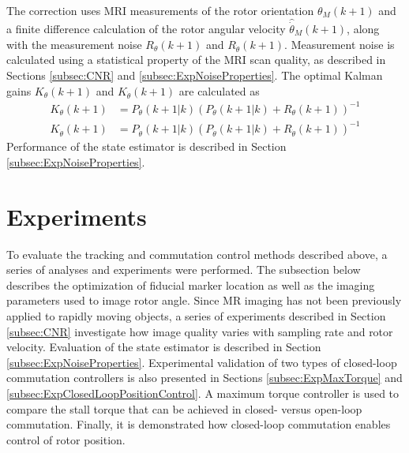 \documentclass[journal]{IEEEtran}
\begin{document}
The correction uses MRI measurements of the rotor orientation $\theta_M(k+1)$ and a finite difference calculation of the rotor angular velocity $\hat{\dot{\theta}}_M(k+1)$, along with the measurement noise $R_{\theta}(k+1)$ and $R_{\dot{\theta}}(k+1)$. Measurement noise is calculated using a statistical property of the MRI scan quality, as described in Sections \ref{subsec:CNR} and \ref{subsec:ExpNoiseProperties}.
The optimal Kalman gains $K_{\theta}(k+1)$ and $K_{\dot{\theta}}(k+1)$ are calculated as
\begin{align}
K_{\theta}(k+1) &= P_{\theta}(k+1|k) ( P_{\theta}(k+1|k)  + R_{\theta}(k+1))^{-1} \nonumber \\
K_{\dot{\theta}}(k+1) &= P_{\dot{\theta}}(k+1|k) ( P_{\dot{\theta}}(k+1|k)  + R_{\dot{\theta}}(k+1))^{-1} 
\label{eq:StateCorrectionKalmanGain}
\end{align}
Performance of the state estimator is described in Section \ref{subsec:ExpNoiseProperties}.

\section{Experiments}
\label{sec:experiments}
To evaluate the tracking and commutation control methods described above, a series of analyses and experiments were performed. The subsection below describes the optimization of fiducial marker location as well as the imaging parameters used to image rotor angle. Since MR imaging has not been previously applied to rapidly moving objects,  a series of experiments described in Section \ref{subsec:CNR} investigate how image quality varies with sampling rate and rotor velocity. Evaluation of the state estimator is described in Section \ref{subsec:ExpNoiseProperties}. Experimental validation of two types of closed-loop commutation controllers is also presented in Sections \ref{subsec:ExpMaxTorque} and \ref{subsec:ExpClosedLoopPositionControl}. A maximum torque controller is used to compare the stall torque that can be achieved in closed- versus open-loop commutation. Finally, it is demonstrated how closed-loop commutation enables control of rotor position.
\end{document}
